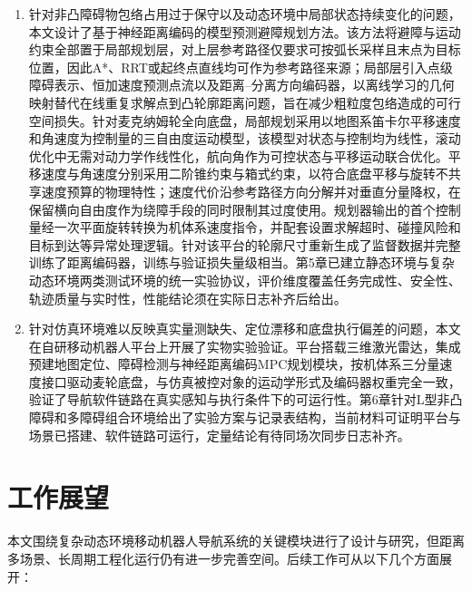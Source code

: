 \begin{enumerate}[label=(\arabic*)]
\item 针对非凸障碍物包络占用过于保守以及动态环境中局部状态持续变化的问题，本文设计了基于神经距离编码的模型预测避障规划方法。该方法将避障与运动约束全部置于局部规划层，对上层参考路径仅要求可按弧长采样且末点为目标位置，因此A*、RRT或起终点直线均可作为参考路径来源；局部层引入点级障碍表示、恒加速度预测点流以及距离--分离方向编码器，以离线学习的几何映射替代在线重复求解点到凸轮廓距离问题，旨在减少粗粒度包络造成的可行空间损失。针对麦克纳姆轮全向底盘，局部规划采用以地图系笛卡尔平移速度和角速度为控制量的三自由度运动模型，该模型对状态与控制均为线性，滚动优化中无需对动力学作线性化，航向角作为可控状态与平移运动联合优化。平移速度与角速度分别采用二阶锥约束与箱式约束，以符合底盘平移与旋转不共享速度预算的物理特性；速度代价沿参考路径方向分解并对垂直分量降权，在保留横向自由度作为绕障手段的同时限制其过度使用。规划器输出的首个控制量经一次平面旋转转换为机体系速度指令，并配套设置求解超时、碰撞风险和目标到达等异常处理逻辑。针对该平台的轮廓尺寸重新生成了监督数据并完整训练了距离编码器，训练与验证损失量级相当。第5章已建立静态环境与复杂动态环境两类测试环境的统一实验协议，评价维度覆盖任务完成性、安全性、轨迹质量与实时性，性能结论须在实际日志补齐后给出。

\item 针对仿真环境难以反映真实量测缺失、定位漂移和底盘执行偏差的问题，本文在自研移动机器人平台上开展了实物实验验证。平台搭载三维激光雷达，集成预建地图定位、障碍检测与神经距离编码MPC规划模块，按机体系三分量速度接口驱动麦轮底盘，与仿真被控对象的运动学形式及编码器权重完全一致，验证了导航软件链路在真实感知与执行条件下的可运行性。第6章针对L型非凸障碍和多障碍组合环境给出了实验方案与记录表结构，当前材料可证明平台与场景已搭建、软件链路可运行，定量结论有待同场次同步日志补齐。
\end{enumerate}

\section{工作展望}
本文围绕复杂动态环境移动机器人导航系统的关键模块进行了设计与研究，但距离多场景、长周期工程化运行仍有进一步完善空间。后续工作可从以下几个方面展开：

